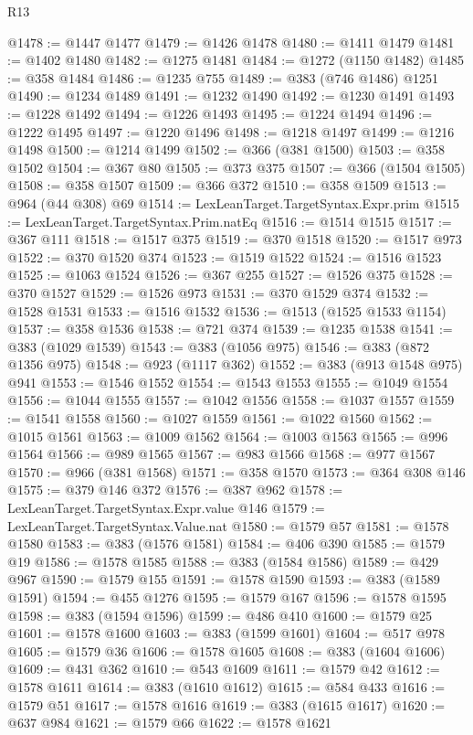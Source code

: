 \begin{lexlean}{R13}
\begin{coremodule}
@1478 := @1447 @1477
@1479 := @1426 @1478
@1480 := @1411 @1479
@1481 := @1402 @1480
@1482 := @1275 @1481
@1484 := @1272 (@1150 @1482)
@1485 := @358 @1484
@1486 := @1235 @755
@1489 := @383 (@746 @1486) @1251
@1490 := @1234 @1489
@1491 := @1232 @1490
@1492 := @1230 @1491
@1493 := @1228 @1492
@1494 := @1226 @1493
@1495 := @1224 @1494
@1496 := @1222 @1495
@1497 := @1220 @1496
@1498 := @1218 @1497
@1499 := @1216 @1498
@1500 := @1214 @1499
@1502 := @366 (@381 @1500)
@1503 := @358 @1502
@1504 := @367 @80
@1505 := @373 @375
@1507 := @366 (@1504 @1505)
@1508 := @358 @1507
@1509 := @366 @372
@1510 := @358 @1509
@1513 := @964 (@44 @308) @69
@1514 := LexLeanTarget.TargetSyntax.Expr.prim
@1515 := LexLeanTarget.TargetSyntax.Prim.natEq
@1516 := @1514 @1515
@1517 := @367 @111
@1518 := @1517 @375
@1519 := @370 @1518
@1520 := @1517 @973
@1522 := @370 @1520 @374
@1523 := @1519 @1522
@1524 := @1516 @1523
@1525 := @1063 @1524
@1526 := @367 @255
@1527 := @1526 @375
@1528 := @370 @1527
@1529 := @1526 @973
@1531 := @370 @1529 @374
@1532 := @1528 @1531
@1533 := @1516 @1532
@1536 := @1513 (@1525 @1533 @1154)
@1537 := @358 @1536
@1538 := @721 @374
@1539 := @1235 @1538
@1541 := @383 (@1029 @1539)
@1543 := @383 (@1056 @975)
@1546 := @383 (@872 @1356 @975)
@1548 := @923 (@1117 @362)
@1552 := @383 (@913 @1548 @975) @941
@1553 := @1546 @1552
@1554 := @1543 @1553
@1555 := @1049 @1554
@1556 := @1044 @1555
@1557 := @1042 @1556
@1558 := @1037 @1557
@1559 := @1541 @1558
@1560 := @1027 @1559
@1561 := @1022 @1560
@1562 := @1015 @1561
@1563 := @1009 @1562
@1564 := @1003 @1563
@1565 := @996 @1564
@1566 := @989 @1565
@1567 := @983 @1566
@1568 := @977 @1567
@1570 := @966 (@381 @1568)
@1571 := @358 @1570
@1573 := @364 @308 @146
@1575 := @379 @146 @372
@1576 := @387 @962
@1578 := LexLeanTarget.TargetSyntax.Expr.value @146
@1579 := LexLeanTarget.TargetSyntax.Value.nat
@1580 := @1579 @57
@1581 := @1578 @1580
@1583 := @383 (@1576 @1581)
@1584 := @406 @390
@1585 := @1579 @19
@1586 := @1578 @1585
@1588 := @383 (@1584 @1586)
@1589 := @429 @967
@1590 := @1579 @155
@1591 := @1578 @1590
@1593 := @383 (@1589 @1591)
@1594 := @455 @1276
@1595 := @1579 @167
@1596 := @1578 @1595
@1598 := @383 (@1594 @1596)
@1599 := @486 @410
@1600 := @1579 @25
@1601 := @1578 @1600
@1603 := @383 (@1599 @1601)
@1604 := @517 @978
@1605 := @1579 @36
@1606 := @1578 @1605
@1608 := @383 (@1604 @1606)
@1609 := @431 @362
@1610 := @543 @1609
@1611 := @1579 @42
@1612 := @1578 @1611
@1614 := @383 (@1610 @1612)
@1615 := @584 @433
@1616 := @1579 @51
@1617 := @1578 @1616
@1619 := @383 (@1615 @1617)
@1620 := @637 @984
@1621 := @1579 @66
@1622 := @1578 @1621

\end{coremodule}
\end{lexlean}
